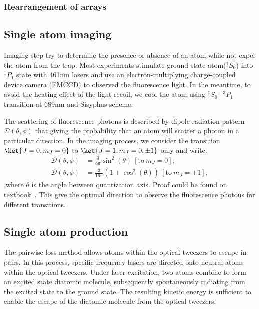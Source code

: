 \documentclass[11pt]{article}
\begin{document}
 \subsubsection{Rearrangement of arrays}
 

\subsection{Single atom imaging\label{subsec:single_atom_image}}
Imaging step try to determine the presence or absence of an atom while not expel the atom from the trap. 
Most experiments stimulate ground state atom($^1S_0$) into $^1P_1$ state with 461nm lasers and use an electron-multiplying charge-coupled device camera  (EMCCD)  to observed the fluorescence light. 
In the meantime, to avoid the heating effect of the light recoil, we cool the atom using $^1S_0 - ^3P_1$ transition at 689nm and Sisyphus scheme. 

The scattering of fluorescence photons is described by dipole radiation pattern $\mathcal{D}(\theta,\phi)$ that giving the probability that an atom will scatter a photon in a particular direction. In the imaging process, we consider the transition $\ket{J = 0, m_J = 0 }$ to $\ket{J =1 , m_J = 0,\pm 1 }$ only and write:
\begin{align}
    \mathcal{D}(\theta,\phi) &= \frac{3}{8\pi} \sin^2(\theta)~[\text{to}~m_J = 0],\\
    \mathcal{D}(\theta,\phi) &= \frac{3}{16\pi} (1 + \cos^2(\theta))~[\text{to}~m_J = \pm 1],
\end{align}
,where $\theta$ is the angle between quantization axis. Proof could be found on textbook~\cite{steck_optic_atoms}. This give the optimal direction to observe the fluorescence photons for different transitions.
\subsection{Single atom production}
The pairwise loss method allows atoms within the optical tweezers to escape in pairs. In this process, specific-frequency lasers are directed onto neutral atoms within the optical tweezers. Under laser excitation, two atoms combine to form an excited state diatomic molecule, subsequently spontaneously radiating from the excited state to the ground state. The resulting kinetic energy is sufficient to enable the escape of the diatomic molecule from the optical tweezers.
\end{document}
